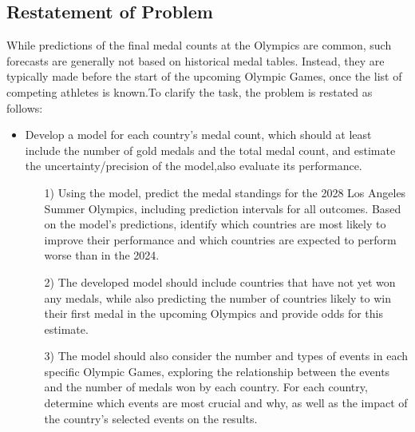 \documentclass[12pt]{article}  %
\begin{document}
\subsection{Restatement of Problem}
While predictions of the final medal counts at the Olympics are common, such forecasts are generally not based on historical medal tables. Instead, they are typically made before the start of the upcoming Olympic Games, once the list of competing athletes is known.To clarify the task, the problem is restated as follows:

\begin{itemize}
	\setlength{\parsep}{0ex} %
	\setlength{\topsep}{2ex} %
	\setlength{\itemsep}{1ex} %
	\item Develop a model for each country’s medal count, which should at least include the number of gold medals and the total medal count, and estimate the uncertainty/precision of the model,also evaluate its performance.
		\begin{itemize}
		\item[1)]
Using the model, predict the medal standings for the 2028 Los Angeles Summer Olympics, including prediction intervals for all outcomes. Based on the model’s predictions, identify which countries are most likely to improve their performance and which countries are expected to perform worse than in the 2024.
	\end{itemize}
	\begin{itemize}
		\item[2)]
		The developed model should include countries that have not yet won any medals, while also predicting the number of countries likely to win their first medal in the upcoming Olympics and provide odds for this estimate.
	\end{itemize}
		\begin{itemize}
		\item[3)]
The model should also consider the number and types of events in each specific Olympic Games, exploring the relationship between the events and the number of medals won by each country. For each country, determine which events are most crucial and why, as well as the impact of the country’s selected events on the results.
	\end{itemize}
	

\end{itemize}
\end{document}
